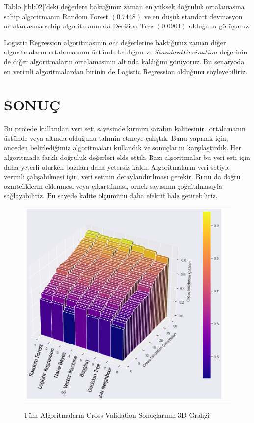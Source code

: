 \documentclass[conference]{IEEEtran}
\begin{document}
\quad Tablo \ref{tbl:02}'deki değerlere baktığımız zaman en yüksek doğruluk ortalamasına sahip algoritmanın Random Forest $(0.7448)$ ve en düşük standart devinasyon ortalamasına sahip algoritmanın da Decision Tree $(0.0903)$ olduğunu görüyoruz.

\quad Logistic Regression algoritmasının $acc$ değerlerine baktığımız zaman diğer algoritmaların ortalamasının üstünde kaldığını ve $StandardDevination$ değerinin de diğer algoritmaların ortalamasının altında kaldığını görüyoruz. Bu senaryoda en verimli algoritmalardan birinin de Logistic Regression olduğunu söyleyebiliriz.


\newpage
\section{\textbf{SONUÇ}}
\quad Bu projede kullanılan veri seti sayesinde kırmızı şarabın kalitesinin, ortalamanın üstünde veya altında olduğunu tahmin etmeye çalıştık. Bunu yapmak için, önceden belirlediğimiz algoritmaları kullandık ve sonuçlarını karşılaştırdık. Her algoritmada farklı doğruluk değerleri elde ettik. Bazı algoritmalar bu veri seti için daha yeterli olurken bazıları daha yetersiz kaldı. Algoritmaların veri setiyle verimli çalışabilmesi için, veri setinin detaylandırılması gerekir. Bunu da doğru özniteliklerin eklenmesi veya çıkartılması, örnek sayısının çoğaltılmasıyla sağlayabiliriz. Bu sayede kalite ölçümünü daha efektif hale getirebiliriz.

\begin{figure}[!h]
	\centering
	\begin{center}
		\begin{tabular}{cc}
			\includegraphics[scale=0.35]{pictures/pic_24.png}&
		\end{tabular}
	\end{center}
	\caption{Tüm Algoritmaların Cross-Validation Sonuçlarının 3D Grafiği}
	\label{fig:24}
\end{figure}
\end{document}
